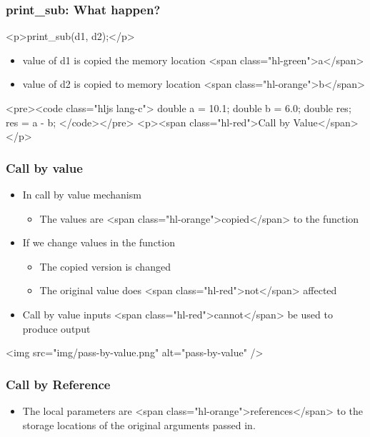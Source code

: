 \documentclass{../c-lecture}
\begin{document}
\begin{frame}
  \frametitle{print_sub: What happen?}
  <p>print_sub(d1, d2);</p>
  \begin{itemize}
    \item
      value of d1 is copied the memory location
      <span class="hl-green">a</span>

    \item
      value of d2 is copied to memory location
      <span class="hl-orange">b</span>

  \end{itemize}
  <pre><code class="hljs lang-c">
double a = 10.1;
double b = 6.0;
double res;
res = a - b;
  </code></pre>
  <p><span class="hl-red">Call by Value</span></p>
\end{frame}
\begin{frame}
  \begin{frame}
    \frametitle{Call by value}
    \begin{itemize}
      \item In call by value mechanism
      \begin{itemize}
        \item
          The values are <span class="hl-orange">copied</span> to the function

      \end{itemize}
      \item If we change values in the function
      \begin{itemize}
        \item The copied version is changed
        \item
          The original value does <span class="hl-red">not</span> affected

      \end{itemize}
      \item
        Call by value inputs <span class="hl-red">cannot</span> be used to
        produce output

    \end{itemize}
  \end{frame}
  \begin{frame}
    <img src="img/pass-by-value.png" alt="pass-by-value" />
  \end{frame}
  \begin{frame}
    \frametitle{Call by Reference}
    \begin{itemize}
      \item
        The local parameters are
        <span class="hl-orange">references</span> to the storage locations of
        the original arguments passed in.


\end{itemize}
\end{frame}
\end{frame}
\end{document}
